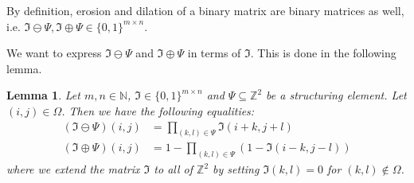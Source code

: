 \documentclass[a4paper,12pt]{article}
\theoremstyle{plain}
\newtheorem{lemma}[theorem]{Lemma}
\theoremstyle{definition}
\begin{document}
By definition, erosion and dilation of a binary matrix are binary matrices as well, i.e. $\mathfrak{I} \ominus \Psi, \mathfrak{I} \oplus \Psi \in \{ 0, 1 \}^{m \times n}$.

We want to express $\mathfrak{I} \ominus \Psi$ and $\mathfrak{I} \oplus \Psi$ in terms of $\mathfrak{I}$. This is done in the following lemma.

\begin{lemma}\label{lem: erodil}
	Let $m, n \in \mathbb{N}$, $\mathfrak{I} \in \{ 0, 1 \}^{m \times n}$ and $\Psi \subseteq \mathbb{Z}^2$ be a structuring element. Let $(i, j) \in \Omega$. Then we have the following equalities:
	\begin{align}
		(\mathfrak{I} \ominus \Psi)(i, j) &= \prod_{(k, l) \in \Psi} \mathfrak{I}(i + k, j + l) \label{eq: erosion} \\
		(\mathfrak{I} \oplus \Psi)(i, j) &= 1 - \prod_{(k, l) \in \Psi} ( 1 - \mathfrak{I}(i - k, j - l) ) \label{eq: dilation}
	\end{align}
	where we extend the matrix $\mathfrak{I}$ to all of $\mathbb{Z}^2$ by setting $\mathfrak{I}(k, l) = 0$ for $(k, l) \notin \Omega$.
\end{lemma}
\end{document}
